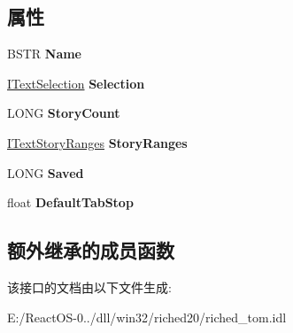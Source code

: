 \subsection*{属性}
\begin{DoxyCompactItemize}
\item 
\mbox{\label{interfacetom_1_1_i_text_document_ad44c6a9aa743d1ef7102827bc584d405}} 
B\+S\+TR {\bfseries Name}
\item 
\mbox{\label{interfacetom_1_1_i_text_document_acac96750bdbc8e76d92df692c8bfe994}} 
\hyperlink{interfacetom_1_1_i_text_selection}{I\+Text\+Selection} {\bfseries Selection}
\item 
\mbox{\label{interfacetom_1_1_i_text_document_a42cc34256332b5449f6c04265c70dae3}} 
L\+O\+NG {\bfseries Story\+Count}
\item 
\mbox{\label{interfacetom_1_1_i_text_document_a58d875c6ab51bd124e506678d0ffbca4}} 
\hyperlink{interfacetom_1_1_i_text_story_ranges}{I\+Text\+Story\+Ranges} {\bfseries Story\+Ranges}
\item 
\mbox{\label{interfacetom_1_1_i_text_document_af731be6437cdfedd80ece86ce3a35d27}} 
L\+O\+NG {\bfseries Saved}
\item 
\mbox{\label{interfacetom_1_1_i_text_document_a35ff882b98e0f83d4c3dc4bb3aceb55b}} 
float {\bfseries Default\+Tab\+Stop}
\end{DoxyCompactItemize}
\subsection*{额外继承的成员函数}


该接口的文档由以下文件生成\+:\begin{DoxyCompactItemize}
\item 
E\+:/\+React\+O\+S-\/0../dll/win32/riched20/riched\+\_\+tom.\+idl\end{DoxyCompactItemize}
